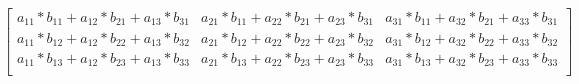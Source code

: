 \documentclass[12pt,letterpaper]{article}
\begin{document}
\begin{itemize}
\begin{enumerate}
\[\begin{bmatrix}
                        a_{11}*b_{11} + a_{12}*b_{21} + a_{13}*b_{31} & a_{21}*b_{11} + a_{22}*b_{21} + a_{23}*b_{31} & a_{31}*b_{11} + a_{32}*b_{21} + a_{33}*b_{31}\\
                        a_{11}*b_{12} + a_{12}*b_{22} + a_{13}*b_{32} & a_{21}*b_{12} + a_{22}*b_{22} + a_{23}*b_{32} & a_{31}*b_{12} + a_{32}*b_{22} + a_{33}*b_{32}\\
                        a_{11}*b_{13} + a_{12}*b_{23} + a_{13}*b_{33} & a_{21}*b_{13} + a_{22}*b_{23} + a_{23}*b_{33} & a_{31}*b_{13} + a_{32}*b_{23} + a_{33}*b_{33}\\
                      \end{bmatrix}
                  \] 
      \end{enumerate}
\end{itemize}
\end{document}
